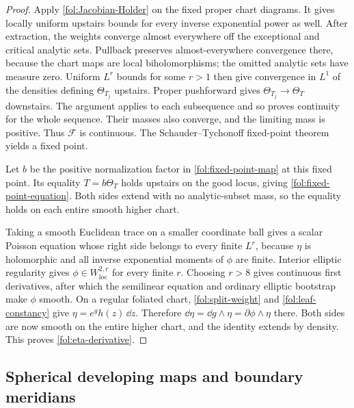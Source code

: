 \begin{proof}
Apply \eqref{fol:Jacobian-Holder} on the fixed proper chart diagrams.
It gives locally uniform upstairs bounds for every inverse exponential
power as well.  After extraction, the weights converge almost everywhere
off the exceptional and critical analytic sets.  Pullback preserves
almost-everywhere convergence there, because the chart maps are local
biholomorphisms; the omitted analytic sets have measure zero.
Uniform $L^r$ bounds for some $r>1$ then give convergence in $L^1$
of the densities defining $\Theta_{T_j}$ upstairs.  Proper
pushforward gives $\Theta_{T_j}\to\Theta_T$ downstairs.  The argument
applies to each subsequence and so proves continuity for the whole
sequence.  Their masses also converge, and the limiting mass is positive.
Thus $\mathcal F$ is continuous.  The Schauder--Tychonoff fixed-point
theorem yields a fixed point.

Let $b$ be the positive normalization factor in
\eqref{fol:fixed-point-map} at this fixed point.  Its equality
$T=b\Theta_T$ holds upstairs on the good locus, giving
\eqref{fol:fixed-point-equation}.  Both sides extend with no
analytic-subset mass, so the equality holds on each entire smooth
higher chart.

Taking a smooth Euclidean trace on a smaller coordinate ball gives a
scalar Poisson equation whose right side belongs to every finite $L^r$,
because $\eta$ is holomorphic and all inverse exponential moments of
$\phi$ are finite.  Interior elliptic regularity gives
$\phi\in W^{2,r}_{\mathrm{loc}}$ for every finite $r$.
Choosing $r>8$ gives continuous first derivatives, after which the
semilinear equation and ordinary elliptic bootstrap make $\phi$ smooth.
On a regular foliated chart,
\eqref{fol:split-weight} and \eqref{fol:leaf-constancy} give
$\eta=e^g h(z)\,\dd z$.  Therefore
$\dd\eta=\dd g\wedge\eta=\partial\phi\wedge\eta$ there.
Both sides are now smooth on the entire higher chart, and the identity
extends by density.  This proves \eqref{fol:eta-derivative}.
\end{proof}

\subsection{Spherical developing maps and boundary meridians}

